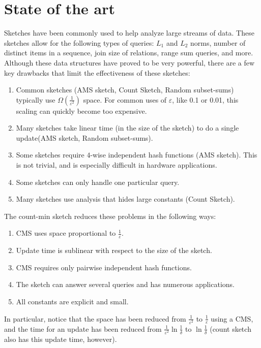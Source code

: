 \documentclass[11pt]{article}
\begin{document}
\section{State of the art}
Sketches have been commonly used to help analyze large streams of data. These sketches allow for the following types of queries: $L_1$ and $L_2$ norms, number of distinct items in a sequence, join size of relations, range sum queries, and more. Although these data structures have proved to be very powerful, there are a few key drawbacks that limit the effectiveness of these sketches:
\begin{enumerate}
    \item Common sketches (AMS sketch, Count Sketch, Random subset-sums)  typically use $\Omega(\frac{1}{\varepsilon^2})$ space. For common uses of $\varepsilon$, like 0.1 or 0.01, this scaling can quickly become too expensive.
    \item Many sketches take linear time (in the size of the sketch) to do a single update(AMS sketch, Random subset-sums). 
    \item Some sketches require $4$-wise independent hash functions (AMS sketch). This is not trivial, and is especially difficult in hardware applications.
    \item Some sketches can only handle one particular query.
    \item Many sketches use analysis that hides large constants (Count Sketch).
\end{enumerate}
The count-min sketch reduces these problems in the following ways:
\begin{enumerate}
    \item CMS uses space proportional to $\frac{1}{\varepsilon}$.
    \item Update time is sublinear with respect to the size of the sketch.
    \item CMS requires only pairwise independent hash functions.
    \item The sketch can answer several queries and has numerous applications.
    \item All constants are explicit and small.
\end{enumerate}
In particular, notice that the space has been reduced from
$\frac{1}{\varepsilon^2}$ to $\frac{1}{\varepsilon}$ using a CMS, and the time
for an update has been reduced from $\frac{1}{\varepsilon^2}\ln{\frac{1}{\delta}}$
to $\ln{\frac{1}{\delta}}$ (count sketch also has this update time, however).
\end{document}
